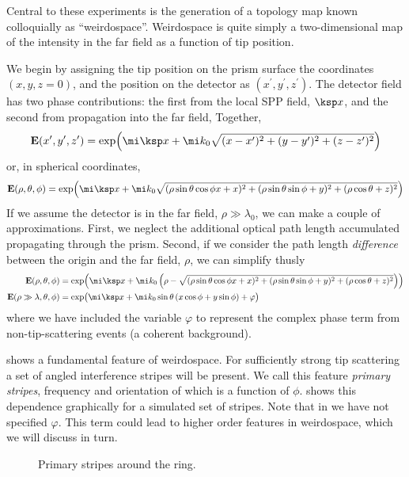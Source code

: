 Central to these experiments is the generation of a topology map known
colloquially as ``weirdospace''.  Weirdospace is quite simply a two-dimensional map of the intensity in the far field as a function of tip position.

We begin by assigning the tip position on the prism surface the coordinates
$(x,y,z=0)$, and the position on the detector as
$(x^\prime,y^\prime,z^\prime)$.  The detector field has two phase
contributions: the first from the local SPP field, $\ksp x$, and the second
from propagation into the far field, Together,
\begin{equation}
\mathbf{E}(x^\prime,y^\prime,z^\prime) = \exp\!\left( \mi\ksp x + %
\mi k_0\sqrt{ (x-x^\prime)^2+ (y-y^\prime)^2+ (z-z^\prime)^2 } \right)
\end{equation}
or, in spherical coordinates,
\begin{equation}
\mathbf{E}(\rho,\theta,\phi) = \exp\!\left( \mi\ksp x + %
\mi k_0\sqrt{
(\rho\sin\theta\cos\phi x+x)^2+(\rho\sin\theta\sin\phi+y)^2+(\rho\cos\theta+z)^2 } \right)
\label{eqn:dingusthusly}
\end{equation}
If we assume the detector is in the far field, $\rho\gg\lambda_0$, we can
make a couple of approximations.  First, we neglect the additional optical
path length accumulated propagating through the prism.  Second, if we
consider the path length \textit{difference} between the origin and the far field,
$\rho$, we can simplify  thusly
\begin{align}
\mathbf{E}(\rho,\theta,\phi) &= \exp\!\left( \mi\ksp x + %
\mi k_0\left(\rho-\sqrt{ (\rho\sin\theta\cos\phi x+x)^2+(\rho\sin\theta\sin\phi+y)^2+(\rho\cos\theta+z)^2
}\right) \right)\\
\mathbf{E}(\rho\gg\lambda,\theta,\phi) &= \exp\!\big( \mi \ksp x
 + \mi k_0 \sin\theta \left(x\cos\phi+y\sin\phi\right)
 + \varphi\big)
	\label{eqn:primarystripes}
\end{align}
where we have included the variable $\varphi$ to represent the complex phase term
from non-tip-scattering events (a coherent background).

 shows a fundamental feature of weirdospace.
For sufficiently strong tip scattering a set of angled interference stripes
will be present.  We call this feature \textit{primary stripes},
frequency and orientation of which is a function of $\phi$.
 shows this
dependence graphically for a simulated set of stripes.  Note that in
 we have not specified $\varphi$.  This term
could lead to higher order features in weirdospace, which we will discuss
in turn.
\begin{figure}
\centering
\caption{Primary stripes around the ring.}
\label{fig:primarystripes}
\end{figure}

